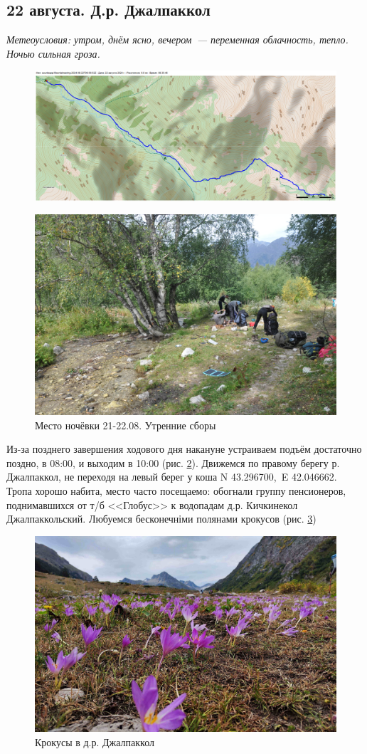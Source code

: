 \subsection{22 августа. Д.р. Джалпаккол}
\textit{Метеоусловия: утром, днём ясно, вечером~--- переменная облачность, тепло. Ночью сильная гроза.}

\begin{figure}[h!]
	\centering
	\includegraphics[angle=0, width=0.4\linewidth]{../pics/mini_maps/22}
	\label{fig:mini_22}
\end{figure}


\begin{figure}[h!]
	\centering
	\includegraphics[width=0.7\linewidth]{../pics/DSC_1181}
	\caption{Место ночёвки 21-22.08. Утренние сборы}
	\label{fig:DSC_1181}
\end{figure}


Из-за позднего завершения ходового дня накануне устраиваем подъём достаточно поздно, в 08:00, и выходим в 10:00 (рис. \ref{fig:DSC_1181}). Движемся по правому берегу р. Джалпаккол, не переходя на левый берег у коша N 43.296700\degree,~E 42.046662\degree. Тропа хорошо набита, место часто посещаемо: обогнали группу пенсионеров, поднимавшихся от т/б <<Глобус>> к водопадам д.р. Кичкинекол Джалпаккольский. Любуемся бесконечніми полянами крокусов (рис. \ref{fig:IMG_20240822_101505})

\begin{figure}[h!]
	\centering
	\includegraphics[width=0.7\linewidth]{../pics/IMG_20240822_101505}
	\caption{Крокусы в д.р. Джалпаккол}
	\label{fig:IMG_20240822_101505}
\end{figure}

